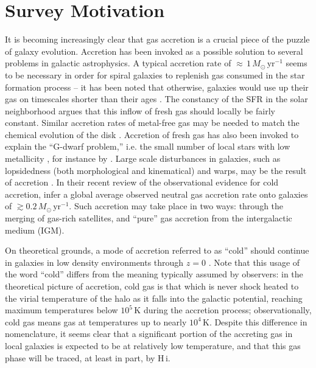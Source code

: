 \documentclass[oldversion]{aa}
\newcommand{\HI}{{\sc H\,i}}
\begin{document}


\maketitle

\section{Survey Motivation}

It is becoming increasingly clear that gas accretion is a crucial piece of the puzzle of galaxy evolution. Accretion has been invoked as a possible solution to several problems in galactic astrophysics. A typical accretion rate of $\approx\,1\,M_{\odot}\,\mathrm{yr}^{-1}$ seems to be necessary in order for spiral galaxies to replenish gas consumed in the star formation process -- it has been noted that otherwise, galaxies would use up their gas on timescales shorter than their ages \citep[e.g.,][]{larson_etal_1980}. The constancy of the SFR in the solar neighborhood \citep{twarog_1980,binney_etal_2000} argues that this inflow of fresh gas should locally be fairly constant. Similar accretion rates of metal-free gas may be needed to match the chemical evolution of the disk \citep[e.g.,][]{lacey_fall_1985,schoenrich_binney_2009}. Accretion of fresh gas has also been invoked to explain the ``G-dwarf problem,'' i.e. the small number of local stars with low metallicity \citep{pagel_1997}, for instance by \citet{chiappini_etal_1997}. Large scale disturbances in galaxies, such as lopsidedness (both morphological and kinematical) and warps, may be the result of accretion \citep{bournaud_etal_2005,sancisi_etal_2008}. In their recent review of the observational evidence for cold accretion, \citet{sancisi_etal_2008} infer a global average observed neutral gas accretion rate onto galaxies of $\gtrsim0.2\,M_{\odot}\,\mathrm{yr}^{-1}$. Such accretion may take place in two ways: through the merging of gas-rich satellites, and ``pure'' gas accretion from the intergalactic medium (IGM).

On theoretical grounds, a mode of accretion referred to as ``cold'' should continue in galaxies in low density environments through $z=0$ \citep[e.g.,][]{keres_etal_2005}. Note that this usage of the word ``cold'' differs from the meaning typically assumed by observers: in the theoretical picture of accretion, cold gas is that which is never shock heated to the virial temperature of the halo as it falls into the galactic potential, reaching maximum temperatures below $10^5\,\mathrm{K}$ during the accretion process; observationally, cold gas means gas at temperatures up to nearly $10^4\,\mathrm{K}$. Despite this difference in nomenclature, it seems clear that a significant portion of the accreting gas in local galaxies is expected to be at relatively low temperature, and that this gas phase will be traced, at least in part, by \HI.
\end{document}
